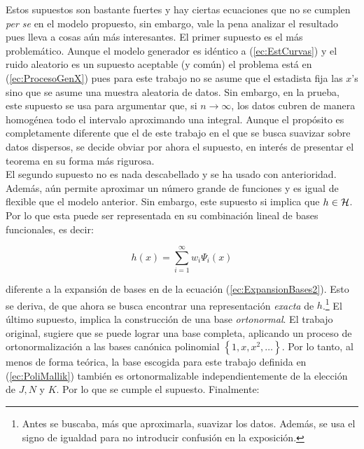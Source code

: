 \documentclass[../Main/Main.tex]{subfiles}
\begin{document}
Estos supuestos son bastante fuertes y hay ciertas ecuaciones que no se cumplen \textit{per se} en el modelo propuesto, sin embargo, vale la pena analizar el resultado pues lleva a cosas aún más interesantes. El primer supuesto es el más problemático. Aunque el modelo generador es idéntico a (\ref{ec:EstCurvas}) y el ruido aleatorio es un supuesto aceptable (y común) el problema está en (\ref{ec:ProcesoGenX}) pues para este trabajo no se asume que el estadista fija las $x$'s sino que se asume una muestra aleatoria de datos. Sin embargo, en la prueba, este supuesto se usa para argumentar que, si $n\rightarrow\infty$, los datos cubren de manera homogénea todo el intervalo aproximando una integral. Aunque el propósito es completamente diferente que el de este trabajo en el que se busca suavizar sobre datos dispersos, se decide obviar por ahora el supuesto, en interés de presentar el teorema en su forma más rigurosa.\\ 

El segundo supuesto no es nada descabellado y se ha usado con anterioridad. Además, aún permite aproximar un número  grande de funciones y es igual de flexible que el modelo anterior. Sin embargo, este supuesto si implica que $h\in\mathcal{H}$. Por lo que esta puede ser representada en su combinación lineal de bases funcionales, es decir:

$$h(x) = \sum_{i = 1}^\infty w_i \Psi_i(x)$$

diferente a la expansión de bases en de la ecuación (\ref{ec:ExpansionBases2}). Esto se deriva, de que ahora se busca encontrar una representación \textit{exacta} de $h$.\footnote{Antes se buscaba, más que aproximarla, suavizar los datos. Además, se usa el signo de igualdad para no introducir confusión en la exposición.} El último supuesto, implica la construcción de una base \textit{ortonormal}. El trabajo original, sugiere que se puede lograr una base completa, aplicando un proceso de ortonormalización a las bases canónica polinomial $\left\{1,x,x^2,\ldots\right\}$. Por lo tanto, al menos de forma teórica, la base escogida para este trabajo definida en (\ref{ec:PoliMallik}) también es ortonormalizable independientemente de la elección de $J,N$ y $K$. Por lo que se cumple el supuesto. Finalmente:
\end{document}
